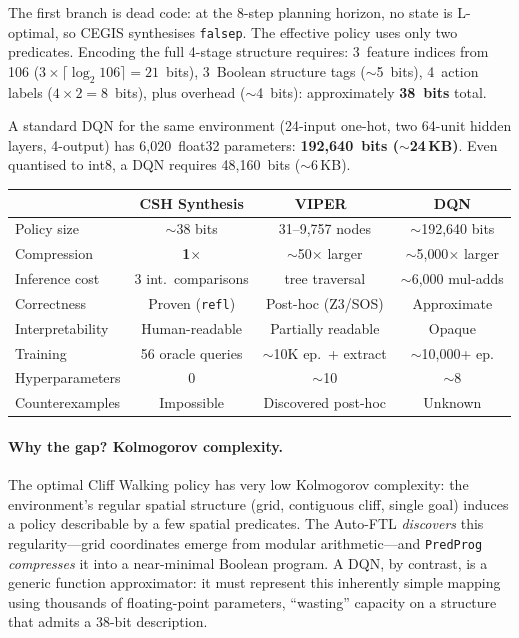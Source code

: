\noindent The first branch is dead code: at the 8-step planning horizon, no state is L-optimal, so CEGIS synthesises \texttt{falsep}.  The effective policy uses only two predicates.  Encoding the full 4-stage structure requires: 3~feature indices from 106 ($3 \times \lceil \log_2 106 \rceil = 21$~bits), 3~Boolean structure tags ($\sim$5~bits), 4~action labels ($4 \times 2 = 8$~bits), plus overhead ($\sim$4~bits): approximately \textbf{38~bits} total.

A standard DQN for the same environment (24-input one-hot, two 64-unit hidden layers, 4-output) has 6{,}020~float32 parameters: \textbf{192{,}640~bits ($\sim$24\,KB)}.  Even quantised to int8, a DQN requires 48{,}160~bits ($\sim$6\,KB).

\begin{center}
\small
\begin{tabular}{@{}lccc@{}}
& \textbf{CSH Synthesis} & \textbf{VIPER}~\cite{Bastani2018} & \textbf{DQN} \\
\hline
Policy size & $\sim$38 bits & 31--9{,}757 nodes & $\sim$192{,}640 bits \\
Compression & \textbf{1$\times$} & $\sim$50$\times$ larger & $\sim$5{,}000$\times$ larger \\
Inference cost & 3 int.\ comparisons & tree traversal & $\sim$6{,}000 mul-adds \\
Correctness & Proven (\texttt{refl}) & Post-hoc (Z3/SOS) & Approximate \\
Interpretability & Human-readable & Partially readable & Opaque \\
Training & 56 oracle queries & ${\sim}$10K ep.\ + extract & $\sim$10{,}000+ ep. \\
Hyperparameters & 0 & ${\sim}$10 & $\sim$8 \\
Counterexamples & Impossible & Discovered post-hoc & Unknown \\
\end{tabular}
\end{center}

\paragraph{Why the gap?  Kolmogorov complexity.}
The optimal Cliff Walking policy has very low Kolmogorov complexity: the environment's regular spatial structure (grid, contiguous cliff, single goal) induces a policy describable by a few spatial predicates.  The Auto-FTL \emph{discovers} this regularity---grid coordinates emerge from modular arithmetic---and \texttt{PredProg} \emph{compresses} it into a near-minimal Boolean program.  A DQN, by contrast, is a generic function approximator: it must represent this inherently simple mapping using thousands of floating-point parameters, ``wasting'' capacity on a structure that admits a 38-bit description.

